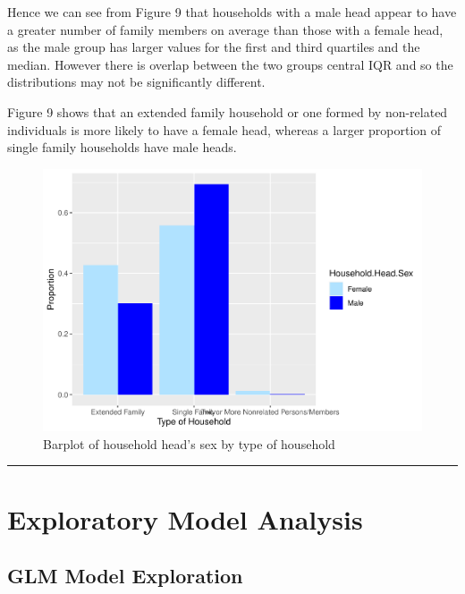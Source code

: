 \documentclass[
]{article}
\begin{document}
Hence we can see from Figure 9 that households with a male head appear
to have a greater number of family members on average than those with a
female head, as the male group has larger values for the first and third
quartiles and the median. However there is overlap between the two
groups central IQR and so the distributions may not be significantly
different.

Figure 9 shows that an extended family household or one formed by
non-related individuals is more likely to have a female head, whereas a
larger proportion of single family households have male heads.

\begin{figure}[H]

{\centering \includegraphics[width=0.8\linewidth]{Group_01_Project2_demo_files/figure-latex/barplot of sex by type of household-1} 

}

\caption{Barplot of household head's sex by type of household}\label{fig:barplot of sex by type of household}
\end{figure}

\begin{center}\rule{0.5\linewidth}{0.5pt}\end{center}

\newpage

\hypertarget{sec:EMA}{%
\section{Exploratory Model Analysis}\label{sec:EMA}}

\hypertarget{glm-model-exploration}{%
\subsection{GLM Model Exploration}\label{glm-model-exploration}}
\end{document}
